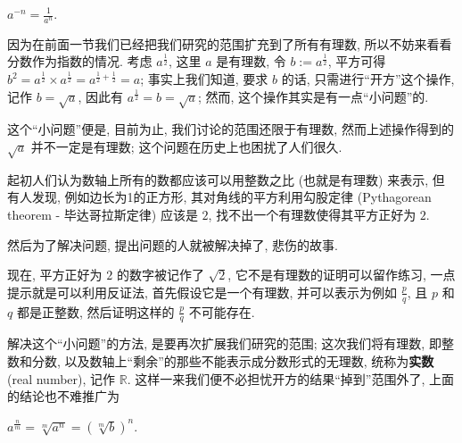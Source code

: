\begin{tcolorbox}[size=fbox, breakable, enhanced jigsaw, title={幂运算
(exponentiation)}]
\begin{itemize}

{\item
  $\boxed{a^{-n}=\frac{1}{a^n}}$.}
\end{itemize}

因为在前面一节我们已经把我们研究的范围扩充到了所有有理数,
所以不妨来看看分数作为指数的情况. 考虑 $a^{\frac{1}{2}}$, 这里 $a$
是有理数, 令 $b:=a^{\frac{1}{2}}$, 平方可得
$b^2=a^{\frac{1}{2}}\times a^{\frac{1}{2}}=a^{\frac{1}{2}+\frac{1}{2}}=a$;
事实上我们知道, 要求 $b$ 的话, 只需进行``开方''这个操作, 记作
$b=\sqrt{a}$, 因此有 $a^{\frac{1}{2}}=b=\sqrt{a}$; 然而,
这个操作其实是有一点``小问题''的.

\begin{newquote}
这个``小问题''便是, 目前为止, 我们讨论的范围还限于有理数,
然而上述操作得到的 $\sqrt{a}$ 并不一定是有理数;
这个问题在历史上也困扰了人们很久.

起初人们认为数轴上所有的数都应该可以用整数之比 (也就是有理数) 来表示,
但有人发现, 例如边长为1的正方形, 其对角线的平方利用{勾股定律}
(Pythagorean theorem - 毕达哥拉斯定律) 应该是 $2$,
找不出一个有理数使得其平方正好为 $2$.

然后为了解决问题, 提出问题的人就被解决掉了, 悲伤的故事.

现在, 平方正好为 $2$ 的数字被记作了 $\sqrt{2}$,
它不是有理数的证明可以留作练习, 一点提示就是可以利用反证法,
首先假设它是一个有理数, 并可以表示为例如 $\frac{p}{q}$, 且 $p$ 和
$q$ 都是正整数, 然后证明这样的 $\frac{p}{q}$ 不可能存在.
\end{newquote}

解决这个``小问题''的方法, 是要再次扩展我们研究的范围; 这次我们将有理数,
即整数和分数, 以及数轴上``剩余''的那些不能表示成分数形式的无理数,
统称为\textbf{实数} (real number), 记作 $\mathbb{R}$.
这样一来我们便不必担忧开方的结果``掉到''范围外了, 上面的结论也不难推广为

\begin{itemize}

{\item
  $\boxed{a^{\frac{n}{m}}=\sqrt[m]{a^n}=(\sqrt[m]{b})^n}$.}
\end{itemize}

\end{tcolorbox}

